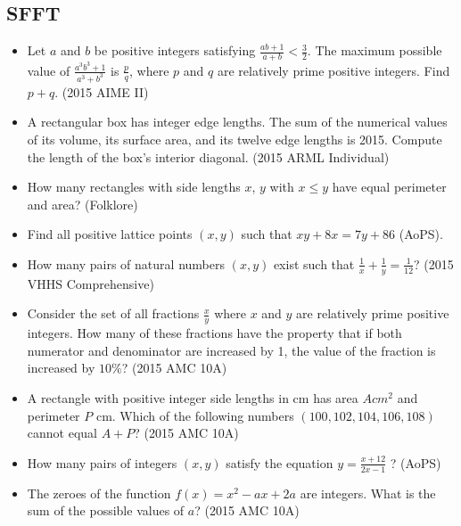 \documentclass{article}
\begin{document}
\subsection{SFFT}

\begin{itemize}

\item Let $a$ and $b$ be positive integers satisfying $\frac{ab+1}{a+b} < \frac{3}{2}$. The maximum possible value of $\frac{a^3b^3+1}{a^3+b^3}$ is $\frac{p}{q}$, where $p$ and $q$ are relatively prime positive integers. Find $p+q$. (2015 AIME II)

\item A rectangular box has integer edge lengths. The sum of the numerical values of its volume, its surface area, and its twelve edge lengths is 2015. Compute the length of the box's interior diagonal. (2015 ARML Individual)

\item How many rectangles with side lengths $x$, $y$ with $x\le y$ have equal perimeter and area? (Folklore)

\item Find all positive lattice points $(x,y)$ such that $ xy+8x=7y+86$ (AoPS).

\item How many pairs of natural numbers $(x,y)$ exist such that $\frac{1}{x}+\frac{1}{y}=\frac{1}{12}$? (2015 VHHS Comprehensive)

\item Consider the set of all fractions $\frac{x}{y}$ where $x$ and $y$ are relatively prime positive integers. How many of these fractions have the property that if both numerator and denominator are increased by 1, the value of the fraction is increased by $10\%$? (2015 AMC 10A)

\item A rectangle with positive integer side lengths in cm has area $A cm^2$ and perimeter $P$ cm. Which of the following numbers $(100, 102, 104, 106, 108)$ cannot equal $A+P$? (2015 AMC 10A)

\item How many pairs of integers $(x,y)$ satisfy the equation $y=\frac{x+12}{2x-1}$ ? (AoPS)

\item The zeroes of the function $f(x)=x^2-ax+2a$ are integers. What is the sum of the possible values of $a$? (2015 AMC 10A)


\end{itemize}
\end{document}
